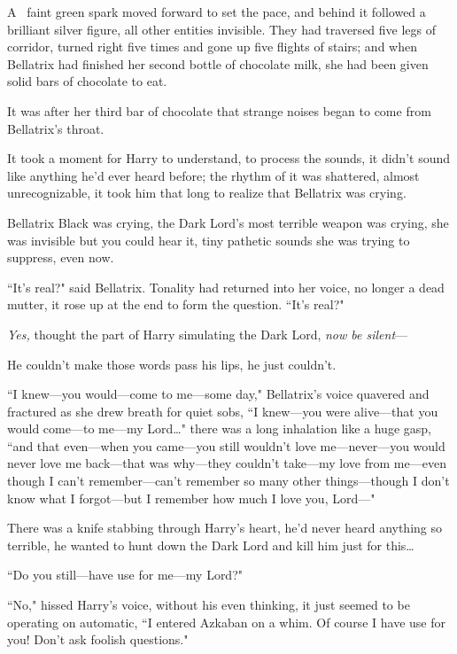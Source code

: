 
\lettrine{A}{~} faint green spark moved forward to set the pace, and behind it followed a brilliant silver figure, all other entities invisible. They had traversed five legs of corridor, turned right five times and gone up five flights of stairs; and when Bellatrix had finished her second bottle of chocolate milk, she had been given solid bars of chocolate to eat.

It was after her third bar of chocolate that strange noises began to come from Bellatrix's throat.

It took a moment for Harry to understand, to process the sounds, it didn't sound like anything he'd ever heard before; the rhythm of it was shattered, almost unrecognizable, it took him that long to realize that Bellatrix was crying.

Bellatrix Black was crying, the Dark Lord's most terrible weapon was crying, she was invisible but you could hear it, tiny pathetic sounds she was trying to suppress, even now.

``It's real?" said Bellatrix. Tonality had returned into her voice, no longer a dead mutter, it rose up at the end to form the question. ``It's real?"

\emph{Yes,} thought the part of Harry simulating the Dark Lord, \emph{now be silent}—

He couldn't make those words pass his lips, he just couldn't.

``I knew—you would—come to me—some day," Bellatrix's voice quavered and fractured as she drew breath for quiet sobs, ``I knew—you were alive—that you would come—to me—my Lord{\ldots}" there was a long inhalation like a huge gasp, ``and that even—when you came—you still wouldn't love me—never—you would never love me back—that was why—they couldn't take—my love from me—even though I can't remember—can't remember so many other things—though I don't know what I forgot—but I remember how much I love you, Lord—"

There was a knife stabbing through Harry's heart, he'd never heard anything so terrible, he wanted to hunt down the Dark Lord and kill him just for this{\ldots}

``Do you still—have use for me—my Lord?"

``No," hissed Harry's voice, without his even thinking, it just seemed to be operating on automatic, ``I entered Azkaban on a whim. Of course I have use for you! Don't ask foolish questions."


